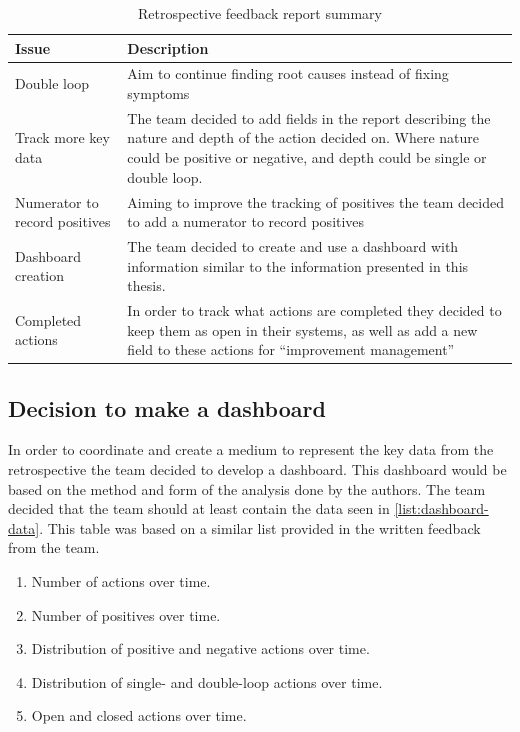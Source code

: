 \begin{table}[!h]
	\begin{center}
	\caption{Retrospective feedback report summary}
	\label{table:Retrospective-Feedback-four}
	\begin{tabular}{ l  p{} }
	\hline
	Issue & Description \\
	\hline
	Double loop & Aim to continue finding root causes instead of fixing symptoms \\
	Track more key data & The team decided to add fields in the report describing the nature and depth of the action decided on. Where nature could be positive or negative, and depth could be single or double loop.\\
	Numerator to record positives & Aiming to improve the tracking of positives the team decided to add a numerator to record positives \\
	Dashboard creation & The team decided to create and use a dashboard with information similar to the information presented in this thesis.  \\
	Completed actions & In order to track what actions are completed they decided to keep them as open in their systems, as well as add a new field to these actions for ``improvement management'' \\
	\hline
	\end{tabular}
	\end{center}
\end{table}

\subsection{Decision to make a dashboard}
In order to coordinate and create a medium to represent the key data from the retrospective the team decided to develop a dashboard. This dashboard would be based on the method and form of the analysis done by the authors.  The team decided that the team should at least contain the data seen in \autoref{list:dashboard-data}. This table was based on a similar list provided in the written feedback from the team. 

\begin{enumerate}
\label{list:dashboard-data}
\item Number of actions over time.
\item Number of positives over time.
\item Distribution of positive and negative actions over time.
\item Distribution of single- and double-loop actions over time.
\item Open and closed actions over time.
\end{enumerate}

